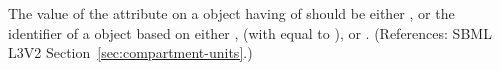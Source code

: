 The value of the attribute  on a \Compartment object having
 of  should be either 
, or the identifier of a \UnitDefinition object based on either
,  (with  equal to ), or
.  (References: SBML L3V2
Section~\ref{sec:compartment-units}.)
